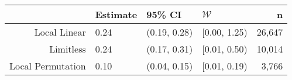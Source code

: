 \begin{tabular}{rlllr}
  \hline
 & Estimate & 95\% CI & $\mathcal{W}$ & n \\ 
  \hline
Local Linear & 0.24 & (0.19, 0.28) & [0.00, 1.25) & 26,647 \\ 
  Limitless & 0.24 & (0.17, 0.31) & [0.01, 0.50) & 10,014 \\ 
  Local Permutation & 0.10 & (0.04, 0.15) & [0.01, 0.19) & 3,766 \\ 
   \hline
\end{tabular}
